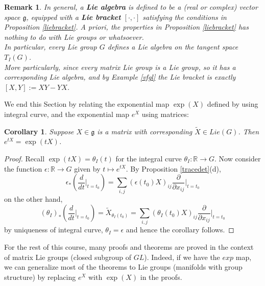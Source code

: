 \documentclass[11pt]{book}
\newtheorem{corollary}[theorem]{Corollary}
\newtheorem{remark}[theorem]{Remark}
\newcommand{\bb}[1]{\mathbb{#1}}
\newcommand{\mf}[1]{\mathfrak{#1}}
\begin{document}
\begin{remark}
In general, a \textbf{Lie algebra} is defined to be a (real or complex) vector space $\mf{g}$, equipped with a \textbf{Lie bracket} $[\cdot,\cdot]$ satisfying the conditions in Proposition \ref{liebracket}. A priori, the properties in Proposition \ref{liebracket} has nothing to do with Lie groups or whatsoever.\\
In particular, every Lie group $G$ defines a Lie algebra on the tangent space $T_I(G)$.\\
More particularly, since every matrix Lie group is a Lie group, so it has a corresponding Lie algebra, and by Example \ref{vfgl} the Lie bracket is exactly $[X,Y] := XY - YX$.
\end{remark}

We end this Section by relating the exponential map $\exp(X)$ defined by using integral curve, and the exponential map $e^X$ using matrices:
\begin{corollary}
Suppose $X \in \mf{g}$ is a matrix with corresponding $\tilde{X} \in Lie(G)$. Then $e^{tX} = \exp(tX)$.
\end{corollary}
\begin{proof}
Recall $\exp(tX) = \theta_I(t)$ for the integral curve $\theta_I: \bb{R} \to G$. Now consider the function $\epsilon: \bb{R} \to G$ given by $t \mapsto e^{tX}$. By Proposition \ref{tracedet}(d),
$$\epsilon_*(\frac{d}{dt}  \Big|_{t = t_0}) = \sum_{i,j} (\epsilon(t_0)X)_{ij} \frac{\partial}{\partial x_{ij}}  \Big|_{t = t_0}$$
on the other hand,
$$(\theta_I)_*(\frac{d}{dt}  \Big|_{t = t_0}) = \tilde{X}_{\theta_I(t_0)} = \sum_{i,j} (\theta_I(t_0)X)_{ij} \frac{\partial}{\partial x_{ij}}  \Big|_{t = t_0}$$
by uniqueness of integral curve, $\theta_I = \epsilon$ and hence the corollary follows.
\end{proof}
For the rest of this course, many proofs and theorems are proved in the context of matrix Lie groups (closed subgroup of $GL$). Indeed, if we have the $exp$ map, we can generalize most of the theorems to Lie groups (manifolds with group structure) by replacing $e^X$ with $\exp(X)$ in the proofs.
\end{document}
